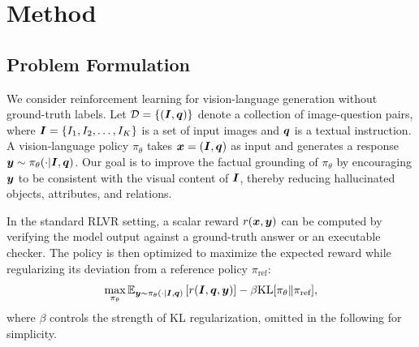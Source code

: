 
\section{Method}
\label{sec:preliminary}


\subsection{Problem Formulation}
\label{sec:problem_formulation}

We consider reinforcement learning for vision-language generation without
ground-truth labels. Let $\mathcal{D}=\{({\bm{I}},{\bm{q}})\}$ denote a collection
of image-question pairs, where ${\bm{I}}=\{I_1,I_2,\dots,I_K\}$ is a set of input images and ${\bm{q}}$ is a textual
instruction. A vision-language policy $\pi_\theta$ takes
${\bm{x}}=({\bm{I}},{\bm{q}})$ as input and generates a response
${\bm{y}} \sim \pi_\theta(\cdot |{\bm{I}},{\bm{q}})$. Our
goal is to improve the factual grounding of $\pi_\theta$ by encouraging
${\bm{y}}$ to be consistent with the visual content of ${\bm{I}}$, thereby
reducing hallucinated objects, attributes, and relations.

In the standard RLVR setting, a scalar reward $r({\bm{x}},{\bm{y}})$ can be computed by
verifying the model output against a ground-truth answer or an executable
checker. The policy is then optimized to maximize the expected reward while
regularizing its deviation from a reference policy $\pi_{\text{ref}}$:
\begin{equation*}
    \max_{\pi_\theta} {\mathbb{E}}_{{\bm{y}}\sim\pi_\theta(\cdot| {\bm{I}},{\bm{q}})}
    \left[
        r({\bm{I}},{\bm{q}},{\bm{y}})
    \right]
    -
    \beta
    \text{KL}[\pi_\theta \Vert \pi_\text{ref}],
\end{equation*}
where $\beta$ controls the strength of KL regularization, omitted in the following for simplicity.

